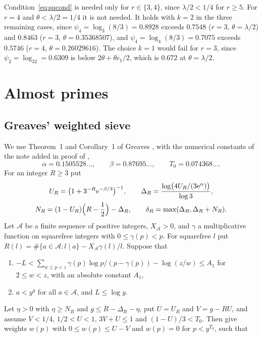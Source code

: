 \documentclass[11pt]{amsart}
\theoremstyle{definition}
\numberwithin{equation}{section}
\newcommand{\e}{\mathrm{e}}
\begin{document}
Condition~\eqref{eq:sqcond} is needed only for $r\in\{3,4\}$, since $\lambda/2<1/4$ for $r\ge5$. For $r=4$ and $\theta<\lambda/2=1/4$ it is not needed. It holds with $k=2$ in the three remaining cases, since $\psi_4=\log_3(8/3)=0.8928$ exceeds $0.7548$ ($r=3$, $\theta=\lambda/2$) and $0.8463$ ($r=3$, $\theta=0.35368507$), and $\psi_4=\log_4(8/3)=0.7075$ exceeds $0.5746$ ($r=4$, $\theta=0.26029616$). The choice $k=1$ would fail for $r=3$, since $\psi_2=\log_32=0.6309$ is below $2\theta+\theta c_1/2$, which is $0.672$ at $\theta=\lambda/2$.

\section{Almost primes}\label{sec:sieve}

\subsection{Greaves' weighted sieve}
We use Theorem~1 and Corollary~1 of Greaves \cite{Gr82}, with the numerical constants of the note added in proof of \cite{Gr82},
\[
\alpha=0.1505528\ldots,\qquad\beta=0.87695\ldots,\qquad T_0=0.074368\ldots.
\]
For an integer $R\ge3$ put
\begin{equation}\label{eq:delta}
\begin{gathered}
U_R=\bigl(1+3^{-R}\e^{-\beta/3}\bigr)^{-1},\qquad\Delta_R=\frac{\log\bigl(4U_R/(3\e^{\alpha})\bigr)}{\log3},\\
N_R=(1-U_R)\Bigl(R-\frac12\Bigr)-\Delta_R,\qquad\delta_R=\max(\Delta_R,\Delta_R+N_R).
\end{gathered}
\end{equation}
Let $\mathcal A$ be a finite sequence of positive integers, $X_{\mathcal A}>0$, and $\gamma$ a multiplicative function on squarefree integers with $0\le\gamma(p)<p$. For squarefree $l$ put $R(l)=\#\{a\in\mathcal A:l\mid a\}-X_{\mathcal A}\gamma(l)/l$. Suppose that
\begin{enumerate}
\item[(A1)] $-L<\sum_{w\le p<z}\gamma(p)\log p/(p-\gamma(p))-\log(z/w)\le A_1$ for $2\le w<z$, with an absolute constant $A_1$,
\item[(A2)] $a<y^g$ for all $a\in\mathcal A$, and $L\le\log y$.
\end{enumerate}
Let $\eta>0$ with $\eta\ge N_R$ and $g\le R-\Delta_R-\eta$, put $U=U_R$ and $V=g-RU$, and assume $V<1/4$, $1/2<U<1$, $3V+U\le1$ and $(1-U)/3<T_0$. Then \cite[Thm.~1, Cor.~1]{Gr82} give weights $w(p)$ with $0\le w(p)\le U-V$ and $w(p)=0$ for $p<y^{T_0}$, such that
\end{document}
